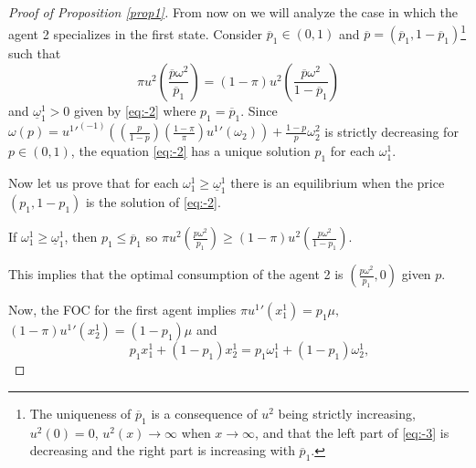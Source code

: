 \documentclass[pdftex]{article}
\numberwithin{equation}{section}
\theoremstyle{th}
\newtheorem{proof lemma}{{Proof Lemma}.}
\theoremstyle{definition}
\newtheorem*{risk lovers}{Risk lovers}
\newtheorem*{risk averse}{Risk averse}
\begin{document}
{\begin{proof}[Proof of Proposition \ref{prop1}]
From now on we will analyze the case in which the agent 2 specializes in the first state. Consider $\overline{p}_1\in\left(0,1\right)$ and $\overline{p}=(\overline{p}_1,1-\overline{p}_1)$\footnote{The uniqueness of $\overline{p}_1$ is a consequence of $u^2$ being strictly increasing, $u^2(0)=0$, $u^2(x)\rightarrow\infty$ when $x\rightarrow\infty$, and that the left part of \ref{eq:-3} is decreasing and the right part is increasing with $\overline{p}_1$.} such that 
\begin{equation}
\pi u{}^{2}\left(\frac{\overline{p}\omega^{2}}{\overline{p}_1}\right)=\left(1-\pi\right)u^{2}\left(\frac{\overline{p}\omega^{2}}{1-\overline{p}_1}\right)\label{eq:-3}
\end{equation}
and $\underline{\omega}_{1}^{1}>0$ given by \ref{eq:-2} where $p_1=\overline{p}_1$. Since $\omega(p)={{u^1}'}^{\left(-1\right)}\!\!\left(\!\left(\frac{p}{1-p}\right)\!\!\left(\frac{1-\pi}{\pi}\right)\!{u^1}'\left(\omega_2\right)\right)+\frac{1-p}{p}\omega_2^2$ is strictly decreasing for $p\in(0,1)$, the equation \ref{eq:-2} has a unique solution $p_1$ for each $\omega_1^1$.

Now let us prove that for each $\omega_{1}^{1}\geq\underline{\omega}_{1}^{1}$ there is an equilibrium when the price $(p_1,1-p_1)$ is the solution
of \ref{eq:-2}.

If $\omega_{1}^{1}\geq\underline{\omega}_{1}^{1}$, then $p_1\leq\overline{p}_1$
so $\pi u{}^{2}\left(\frac{p\omega^{2}}{p_1}\right)\geq\left(1-\pi\right)u^{2}\left(\frac{p\omega^{2}}{1-p_1}\right).$

This implies that the optimal consumption of the agent 2 is $\left(\!\frac{p\omega^{2}}{p_1},\!0\!\right)$ given $p$.

Now, the FOC for the first agent implies
$\pi {u^1}'\left(x_{1}^{1}\right)=p_1\mu,$
$\left(1-\pi\right){u^1}'\left(x_{2}^{1}\right)=\left(1-p_1\right)\mu$
and
\begin{equation}
\ \ \ \ \ \ \ \ p_1x_{1}^{1}+\left(1-p_1\right)x_{2}^{1}=p_1\omega_{1}^{1}+\left(1-p_1\right)\omega_{2}^{1},\label{eq:-4}
\end{equation}



\end{proof}}
\end{document}
